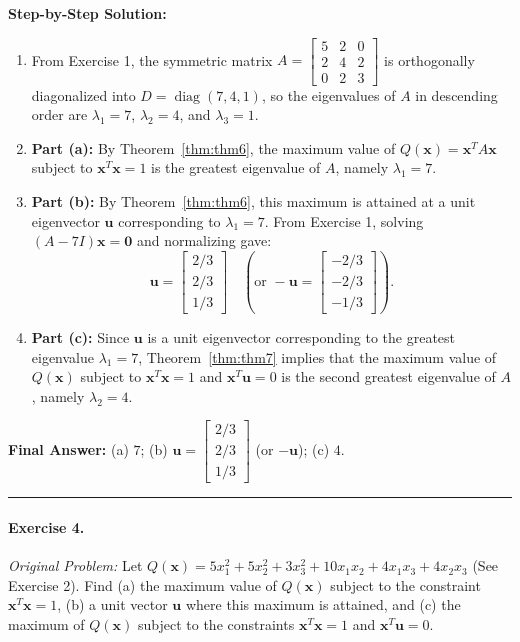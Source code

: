 \documentclass[11pt, letterpaper]{article}
\theoremstyle{definition}
\theoremstyle{remark}
\begin{document}
\textbf{Step-by-Step Solution:}
\begin{enumerate}[leftmargin=2em]
    \item From Exercise 1, the symmetric matrix $A = \begin{bmatrix} 5 & 2 & 0 \\ 2 & 4 & 2 \\ 0 & 2 & 3 \end{bmatrix}$ is orthogonally diagonalized into $D = \operatorname{diag}(7, 4, 1)$, so the eigenvalues of $A$ in descending order are $\lambda_1 = 7$, $\lambda_2 = 4$, and $\lambda_3 = 1$.
    \item \textbf{Part (a):} By Theorem~\ref{thm:thm6}, the maximum value of $Q(\mathbf{x}) = \mathbf{x}^T A \mathbf{x}$ subject to $\mathbf{x}^T \mathbf{x} = 1$ is the greatest eigenvalue of $A$, namely $\lambda_1 = 7$.
    \item \textbf{Part (b):} By Theorem~\ref{thm:thm6}, this maximum is attained at a unit eigenvector $\mathbf{u}$ corresponding to $\lambda_1 = 7$. From Exercise 1, solving $(A - 7I)\mathbf{x} = \mathbf{0}$ and normalizing gave:
    \[
    \mathbf{u} = \begin{bmatrix} 2/3 \\ 2/3 \\ 1/3 \end{bmatrix} \quad \left(\text{or } -\mathbf{u} = \begin{bmatrix} -2/3 \\ -2/3 \\ -1/3 \end{bmatrix}\right).
    \]
    \item \textbf{Part (c):} Since $\mathbf{u}$ is a unit eigenvector corresponding to the greatest eigenvalue $\lambda_1 = 7$, Theorem~\ref{thm:thm7} implies that the maximum value of $Q(\mathbf{x})$ subject to $\mathbf{x}^T \mathbf{x} = 1$ and $\mathbf{x}^T \mathbf{u} = 0$ is the second greatest eigenvalue of $A$, namely $\lambda_2 = 4$.
\end{enumerate}
\textbf{Final Answer:} (a) $7$; \quad (b) $\mathbf{u} = \begin{bmatrix} 2/3 \\ 2/3 \\ 1/3 \end{bmatrix}$ (or $-\mathbf{u}$); \quad (c) $4$.

\medskip
\hrule
\medskip

\paragraph{Exercise 4.}
\emph{Original Problem:} Let $Q(\mathbf{x}) = 5x_1^2 + 5x_2^2 + 3x_3^2 + 10x_1 x_2 + 4x_1 x_3 + 4x_2 x_3$ (See Exercise 2). Find (a) the maximum value of $Q(\mathbf{x})$ subject to the constraint $\mathbf{x}^T \mathbf{x} = 1$, (b) a unit vector $\mathbf{u}$ where this maximum is attained, and (c) the maximum of $Q(\mathbf{x})$ subject to the constraints $\mathbf{x}^T \mathbf{x} = 1$ and $\mathbf{x}^T \mathbf{u} = 0$.
\end{document}

